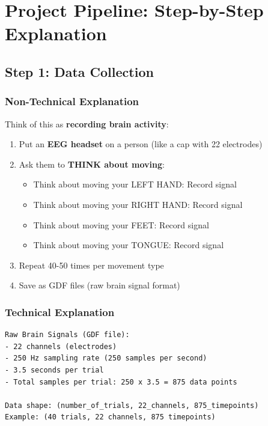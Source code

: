 \documentclass[12pt,a4paper]{article}
\begin{document}
\section{Project Pipeline: Step-by-Step Explanation}

\subsection{Step 1: Data Collection}

\subsubsection{Non-Technical Explanation}

Think of this as \textbf{recording brain activity}:

\begin{tcolorbox}[colback=green!10,colframe=green!50!black,title=Recording Process]
\begin{enumerate}
    \item Put an \textbf{EEG headset} on a person (like a cap with 22 electrodes)
    \item Ask them to \textbf{THINK about moving}:
    \begin{itemize}
        \item Think about moving your LEFT HAND: Record signal
        \item Think about moving your RIGHT HAND: Record signal
        \item Think about moving your FEET: Record signal
        \item Think about moving your TONGUE: Record signal
    \end{itemize}
    \item Repeat 40-50 times per movement type
    \item Save as GDF files (raw brain signal format)
\end{enumerate}
\end{tcolorbox}

\subsubsection{Technical Explanation}

\begin{lstlisting}[caption={Raw Data Format}]
Raw Brain Signals (GDF file):
- 22 channels (electrodes)
- 250 Hz sampling rate (250 samples per second)
- 3.5 seconds per trial
- Total samples per trial: 250 x 3.5 = 875 data points

Data shape: (number_of_trials, 22_channels, 875_timepoints)
Example: (40 trials, 22 channels, 875 timepoints)
\end{lstlisting}
\end{document}
